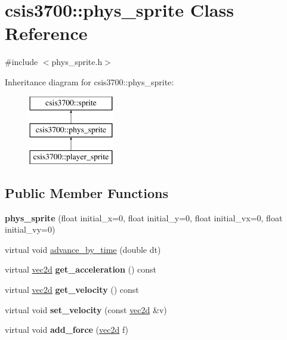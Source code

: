 \hypertarget{classcsis3700_1_1phys__sprite}{}\section{csis3700\+:\+:phys\+\_\+sprite Class Reference}
\label{classcsis3700_1_1phys__sprite}


{\ttfamily \#include $<$phys\+\_\+sprite.\+h$>$}

Inheritance diagram for csis3700\+:\+:phys\+\_\+sprite\+:\begin{figure}[H]
\begin{center}
\leavevmode
\includegraphics[height=3.000000cm]{classcsis3700_1_1phys__sprite}
\end{center}
\end{figure}
\subsection*{Public Member Functions}
\begin{DoxyCompactItemize}
\item 
\mbox{\label{classcsis3700_1_1phys__sprite_a300b8fcf6d18176c9dced92cd90edd99}} 
{\bfseries phys\+\_\+sprite} (float initial\+\_\+x=0, float initial\+\_\+y=0, float initial\+\_\+vx=0, float initial\+\_\+vy=0)
\item 
virtual void \hyperlink{classcsis3700_1_1phys__sprite_a3bb24599b1bc2fd13846826308914db4}{advance\+\_\+by\+\_\+time} (double dt)
\item 
\mbox{\label{classcsis3700_1_1phys__sprite_abfb6a2b73daef8df26dedf0c93e29ec3}} 
virtual \hyperlink{classcsis3700_1_1vec2d}{vec2d} {\bfseries get\+\_\+acceleration} () const
\item 
\mbox{\label{classcsis3700_1_1phys__sprite_a91af42ded6d701df0d25ddd08ff70758}} 
virtual \hyperlink{classcsis3700_1_1vec2d}{vec2d} {\bfseries get\+\_\+velocity} () const
\item 
\mbox{\label{classcsis3700_1_1phys__sprite_a2dd7b26fd33125f84f3eccabac146dcd}} 
virtual void {\bfseries set\+\_\+velocity} (const \hyperlink{classcsis3700_1_1vec2d}{vec2d} \&v)
\item 
\mbox{\label{classcsis3700_1_1phys__sprite_ade2d0f1d3e03981d89a8549ec3a1999c}} 
virtual void {\bfseries add\+\_\+force} (\hyperlink{classcsis3700_1_1vec2d}{vec2d} f)
\end{DoxyCompactItemize}

